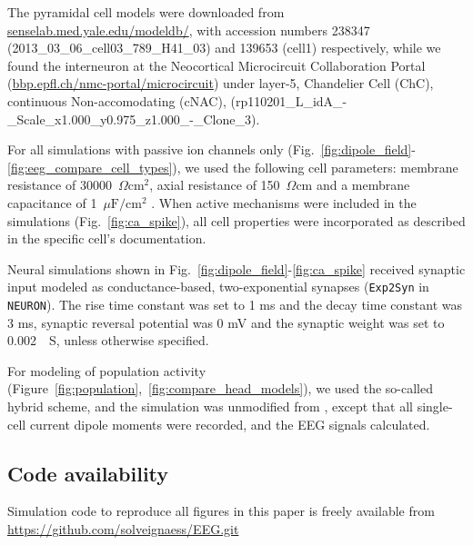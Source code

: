 \documentclass[preprint,10pt,authoryear]{elsarticle}
\newcommand{\hlb}[2][NavyBlue]{ {\sethlcolor{#1} \hl{#2}} }
\newcommand{\hlg}[2][Emerald]{ {\sethlcolor{#1} \hl{#2}} }
\newcommand{\snnote}[1]{\color{white}{\hlb{SN: #1 }}\color{black}}
\newcommand{\tvnnote}[1]{\color{white}{\hlg{TVN: #1 }}\color{black}}
\newcommand{\tvntxt}[1]{{\color{Emerald}#1}}
\begin{document}
The pyramidal cell models were downloaded from \url{senselab.med.yale.edu/modeldb/}, with accession numbers 238347 (2013\_03\_06\_cell03\_789\_H41\_03) and 139653 (cell1) respectively, while we found the interneuron at the Neocortical Microcircuit Collaboration Portal (\url{bbp.epfl.ch/nmc-portal/microcircuit}) under layer-5, Chandelier Cell (ChC), continuous Non-accomodating (cNAC), (rp110201\_L\_idA\_-\_Scale\_x1.000\_y0.975\_z1.000\_-\_Clone\_3). %

For all simulations with passive ion channels only (Fig.~\ref{fig:dipole_field}-\ref{fig:eeg_compare_cell_types}), 
we used the following cell parameters: membrane resistance of 30000~$\Omega \text{cm}^2$, axial resistance of 150~$\Omega \text{cm}$ \citep{MAINEN1996} and a membrane capacitance of 1~$\mu\text{F}/\text{cm}^2$ %
\citep{GENTET2000,STERRATT2011}. When active mechanisms were included in the simulations (Fig.~\ref{fig:ca_spike}), all cell properties were incorporated as described in the specific cell's documentation.

Neural simulations shown in Fig.~\ref{fig:dipole_field}-\ref{fig:ca_spike} received synaptic input modeled as conductance-based, two-exponential synapses (\texttt{Exp2Syn} in \texttt{NEURON}). The rise time constant was set to 1 ms and the decay time constant was 3 ms, synaptic reversal potential was 0 mV and the synaptic weight was set to 0.002~\si{\mu S}, unless otherwise specified. %

For modeling of population activity (Figure~\ref{fig:population},~\ref{fig:compare_head_models}), we  used the so-called hybrid scheme, and the simulation was unmodified from \cite{HAGEN2016}, except that all single-cell current dipole moments were recorded, and the EEG signals calculated.

\subsection{Code availability}
Simulation code to reproduce all figures in this paper is freely available from \url{https://github.com/solveignaess/EEG.git}

\end{document}
